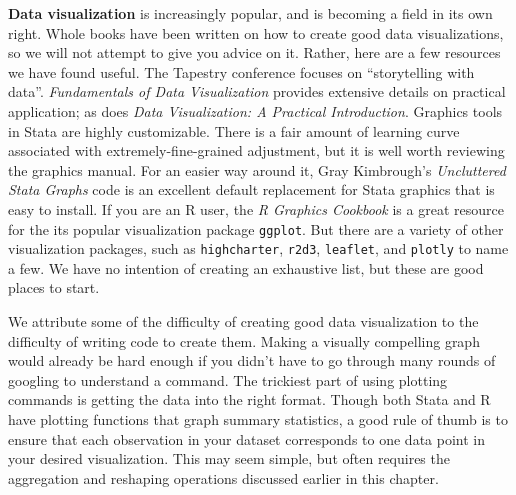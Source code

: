 \textbf{Data visualization} 
is increasingly popular,
and is becoming a field in its own right.\cite{healy2018data,wilke2019fundamentals}
Whole books have been written on how to create good data visualizations,
so we will not attempt to give you advice on it.
Rather, here are a few resources we have found useful.
The Tapestry conference focuses on ``storytelling with data''.
\textit{Fundamentals of Data Visualization} provides extensive details on practical application;
as does \textit{Data Visualization: A Practical Introduction}.
Graphics tools in Stata are highly customizable.
There is a fair amount of learning curve associated with
extremely-fine-grained adjustment,
but it is well worth reviewing the graphics manual.
For an easier way around it, Gray Kimbrough's
\textit{Uncluttered Stata Graphs}
code is an excellent default replacement for Stata graphics
that is easy to install.
If you are an R user, the \textit{R Graphics Cookbook}
is a great resource for the its popular visualization package \texttt{ggplot}.
But there are a variety of other visualization packages,
such as \texttt{highcharter}, \texttt{r2d3}, \texttt{leaflet},
and \texttt{plotly} to name a few. 
We have no intention of creating an exhaustive list,
but these are good places to start.

We attribute some of the difficulty of creating good data visualization
to the difficulty of writing code to create them.
Making a visually compelling graph would already be hard enough if
you didn't have to go through many rounds of googling to understand a command.
The trickiest part of using plotting commands is getting the data into the right format.
Though both Stata and R have plotting functions that graph summary statistics,
a good rule of thumb is to ensure that each
observation in your dataset corresponds to one data point in your desired visualization.
This may seem simple,
but often requires the aggregation and reshaping operations
discussed earlier in this chapter.

